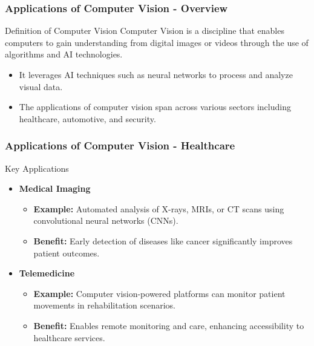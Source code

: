 \documentclass[aspectratio=169]{beamer}
\begin{document}
\begin{frame}[fragile]
    \frametitle{Applications of Computer Vision - Overview}
    \begin{block}{Definition of Computer Vision}
        Computer Vision is a discipline that enables computers to gain understanding from digital images or videos through the use of algorithms and AI technologies.
    \end{block}
    \begin{itemize}
        \item It leverages AI techniques such as neural networks to process and analyze visual data.
        \item The applications of computer vision span across various sectors including healthcare, automotive, and security.
    \end{itemize}
\end{frame}

\begin{frame}[fragile]
    \frametitle{Applications of Computer Vision - Healthcare}
    \begin{block}{Key Applications}
        \begin{itemize}
            \item \textbf{Medical Imaging}
                \begin{itemize}
                    \item \textbf{Example:} Automated analysis of X-rays, MRIs, or CT scans using convolutional neural networks (CNNs).
                    \item \textbf{Benefit:} Early detection of diseases like cancer significantly improves patient outcomes.
                \end{itemize}
            \item \textbf{Telemedicine}
                \begin{itemize}
                    \item \textbf{Example:} Computer vision-powered platforms can monitor patient movements in rehabilitation scenarios.
                    \item \textbf{Benefit:} Enables remote monitoring and care, enhancing accessibility to healthcare services.
                \end{itemize}
        \end{itemize}
    \end{block}
\end{frame}
\end{document}
